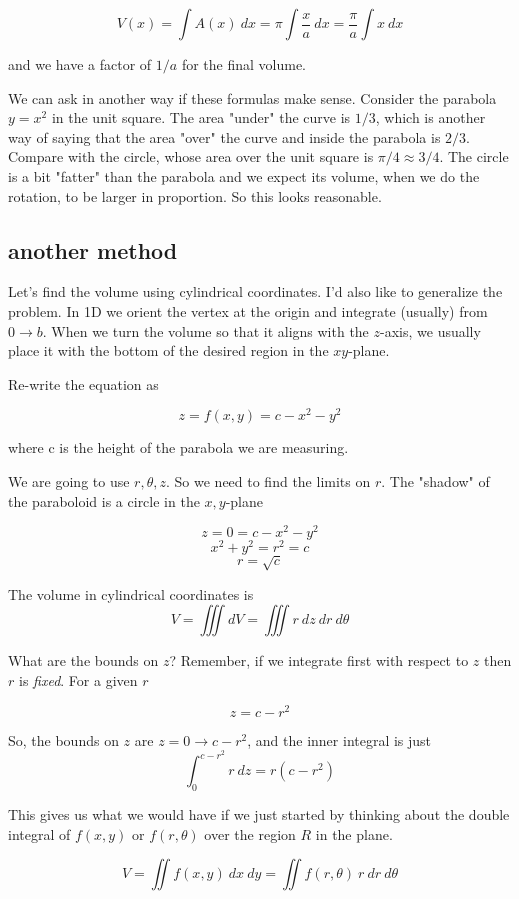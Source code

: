 \documentclass[11pt, oneside]{article}   	%
\begin{document}
\[ V(x) = \int A(x) \ dx = \pi \int \frac{x}{a} \ dx =  \frac{\pi}{a} \int x \ dx \]

and we have a factor of $1/a$ for the final volume.  

We can ask in another way if these formulas make sense.  Consider the parabola $y=x^2$ in the unit square.  The area "under" the curve is $1/3$, which is another way of saying that the area "over" the curve and inside the parabola is $2/3$.  Compare with the circle, whose area over the unit square is $\pi/4 \approx 3/4$.  The circle is a bit "fatter" than the parabola and we expect its volume, when we do the rotation, to be larger in proportion.  So this looks reasonable.

\subsection*{another method}

Let's find the volume using cylindrical coordinates.  I'd also like to generalize the problem.  In 1D we orient the vertex at the origin and integrate (usually) from $0 \rightarrow b$.  When we turn the volume so that it aligns with the $z$-axis, we usually place it with the bottom of the desired region in the $xy$-plane.  

Re-write the equation as

\[ z = f(x,y) = c - x^2 - y^2 \]

where c is the height of the parabola we are measuring.  

We are going to use $r, \theta, z$.  So we need to find the limits on $r$.  The "shadow" of the paraboloid is a circle in the $x,y$-plane 

\[ z = 0 = c - x^2 - y^2 \]
\[ x^2 + y^2 = r^2 = c \]
\[ r = \sqrt{c} \]

The volume in cylindrical coordinates is
\[ V = \iiint dV = \iiint r \ dz \ dr \ d \theta \]

What are the bounds on $z$?  Remember, if we integrate first with respect to $z$ then $r$ is \emph{fixed}.  For a given $r$

\[ z =  c - r^2  \]

So, the bounds on $z$ are $z=0 \rightarrow c - r^2$, and the inner integral is just
\[ \int_0^{c-r^2} r \ dz = r( c-r^2) \]

This gives us what we would have if we just started by thinking about the double integral of $f(x,y)$ or $f(r,\theta)$ over the region $R$ in the plane.

\[ V = \iint f(x,y) \ dx \ dy = \iint f(r,\theta) \ r \ dr \ d \theta \]
\end{document}
